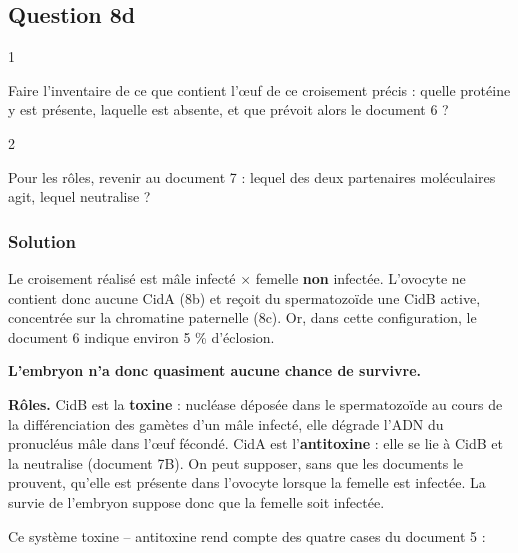 \documentclass[11pt,a4paper]{article}
\begin{document}
\hypertarget{question-8d}{%
\subsection{Question 8d}\label{question-8d}}

\begin{indication}{1}

Faire l'inventaire de ce que contient l'œuf de ce croisement précis : quelle protéine y est présente, laquelle est absente, et que prévoit alors le document 6 ?

\end{indication}

\begin{indication}{2}

Pour les rôles, revenir au document 7 : lequel des deux partenaires moléculaires agit, lequel neutralise ?

\end{indication}

\hypertarget{solution-60}{%
\subsubsection{Solution}\label{solution-60}}

Le croisement réalisé est mâle infecté × femelle \textbf{non} infectée. L'ovocyte ne contient donc aucune CidA (8b) et reçoit du spermatozoïde une CidB active, concentrée sur la chromatine paternelle (8c). Or, dans cette configuration, le document 6 indique environ 5 \% d'éclosion.

\textbf{L'embryon n'a donc quasiment aucune chance de survivre.}

\textbf{Rôles.} CidB est la \textbf{toxine} : nucléase déposée dans le spermatozoïde au cours de la différenciation des gamètes d'un mâle infecté, elle dégrade l'ADN du pronucléus mâle dans l'œuf fécondé. CidA est l'\textbf{antitoxine} : elle se lie à CidB et la neutralise (document 7B). On peut supposer, sans que les documents le prouvent, qu'elle est présente dans l'ovocyte lorsque la femelle est infectée. La survie de l'embryon suppose donc que la femelle soit infectée.

Ce système toxine -- antitoxine rend compte des quatre cases du document 5 :
\end{document}
